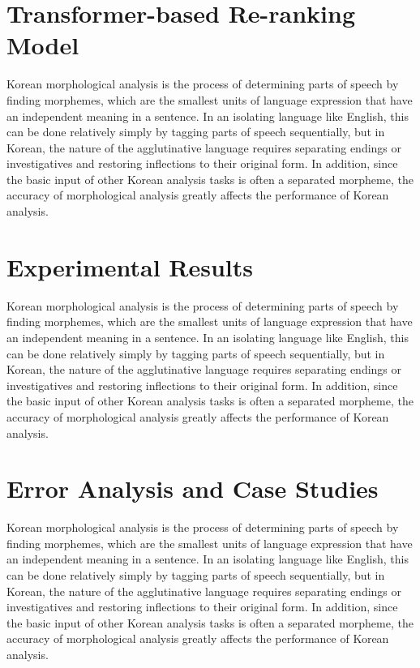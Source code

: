 \documentclass[AMS,STIX2COL]{WileyNJD-v2}
\begin{document}
    \section{Transformer-based Re-ranking Model}\label{sec4}

    Korean morphological analysis is the process of determining parts of speech by finding morphemes, which are the smallest units of language expression that have an independent meaning in a sentence.
    In an isolating language like English, this can be done relatively simply by tagging parts of speech sequentially, but in Korean, the nature of the agglutinative language requires separating endings or investigatives and restoring inflections to their original form.
    In addition, since the basic input of other Korean analysis tasks is often a separated morpheme, the accuracy of morphological analysis greatly affects the performance of Korean analysis.



    \section{Experimental Results}\label{sec5}

    Korean morphological analysis is the process of determining parts of speech by finding morphemes, which are the smallest units of language expression that have an independent meaning in a sentence.
    In an isolating language like English, this can be done relatively simply by tagging parts of speech sequentially, but in Korean, the nature of the agglutinative language requires separating endings or investigatives and restoring inflections to their original form.
    In addition, since the basic input of other Korean analysis tasks is often a separated morpheme, the accuracy of morphological analysis greatly affects the performance of Korean analysis.



    \section{Error Analysis and Case Studies}\label{sec6}

    Korean morphological analysis is the process of determining parts of speech by finding morphemes, which are the smallest units of language expression that have an independent meaning in a sentence.
    In an isolating language like English, this can be done relatively simply by tagging parts of speech sequentially, but in Korean, the nature of the agglutinative language requires separating endings or investigatives and restoring inflections to their original form.
    In addition, since the basic input of other Korean analysis tasks is often a separated morpheme, the accuracy of morphological analysis greatly affects the performance of Korean analysis.
\end{document}
